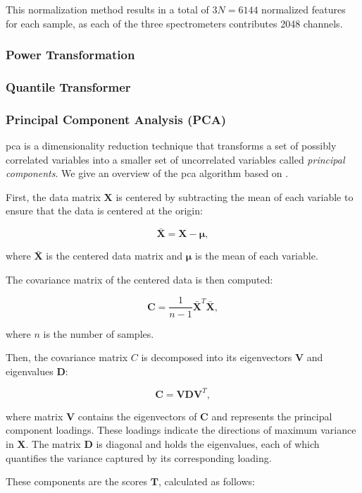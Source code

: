 This normalization method results in a total of $3N = 6144$ normalized features for each sample, as each of the three spectrometers contributes 2048 channels.

\subsubsection{Power Transformation}

\subsubsection{Quantile Transformer}

\subsubsection{Principal Component Analysis (PCA)}
\gls{pca} is a dimensionality reduction technique that transforms a set of possibly correlated variables into a smaller set of uncorrelated variables called \textit{principal components}.
We give an overview of the \gls{pca} algorithm based on \citet{James2023AnIS}.

First, the data matrix $\mathbf{X}$ is centered by subtracting the mean of each variable to ensure that the data is centered at the origin:

$$
\mathbf{\bar{X}} = \mathbf{X} - \mathbf{\mu},
$$

where $\mathbf{\bar{X}}$ is the centered data matrix and $\mathbf{\mu}$ is the mean of each variable.

The covariance matrix of the centered data is then computed:

$$
\mathbf{C} = \frac{1}{n-1} \mathbf{\bar{X}}^T \mathbf{\bar{X}},
$$

where $n$ is the number of samples.

Then, the covariance matrix $C$ is decomposed into its eigenvectors $\mathbf{V}$ and eigenvalues $\mathbf{D}$:

$$
\mathbf{C} = \mathbf{V} \mathbf{D} \mathbf{V}^T,
$$

where matrix $\mathbf{V}$ contains the eigenvectors of $\mathbf{C}$ and represents the principal component loadings.
These loadings indicate the directions of maximum variance in $\mathbf{X}$.
The matrix $\mathbf{D}$ is diagonal and holds the eigenvalues, each of which quantifies the variance captured by its corresponding loading.

These components are the scores $\mathbf{T}$, calculated as follows:

